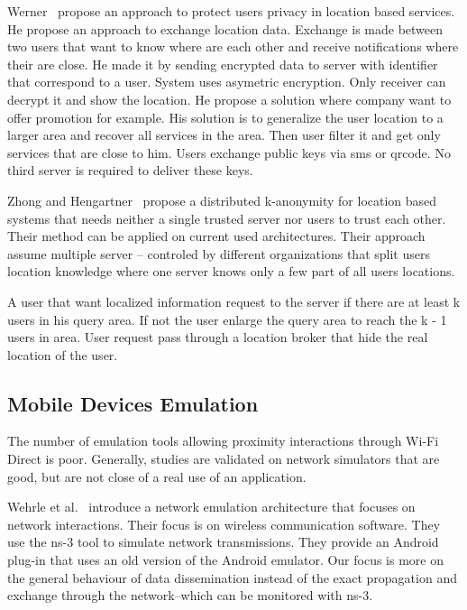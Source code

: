 Werner~\cite{DBLP:conf/mobisec/Werner10} propose an approach to protect users privacy in location based services.
He propose an approach to exchange location data.
Exchange is made between two users that want to know where are each other and receive notifications where their are close.
He made it by sending encrypted data to server with identifier that correspond to a user.
System uses asymetric encryption.
Only receiver can decrypt it and show the location.
He propose a solution where company want to offer promotion for example.
His solution is to generalize the user location to a larger area and recover all services in the area.
Then user filter it and get only services that are close to him.
Users exchange public keys via sms or qrcode.
No third server is required to deliver these keys.

Zhong and Hengartner~\cite{DBLP:conf/percom/ZhongH09} propose a distributed k-anonymity for location based systems that needs neither a single trusted server nor users to trust each other.
Their method can be applied on current used architectures.
Their approach assume multiple server -- controled by different organizations that split users location knowledge where one server knows only a few part of all users locations.

A user that want localized information request to the server if there are at least k users in his query area. If not the user enlarge the query area to reach the k - 1 users in area.
User request pass through a location broker that hide the real location of the user.


\subsection{Mobile Devices Emulation}

The number of emulation tools allowing proximity interactions through Wi-Fi Direct is poor.
Generally, studies are validated on network simulators that are good, but are not close of a real use of an application.

Wehrle et al.~\cite{DBLP:conf/simutools/WeingartnerLW11} introduce a network emulation architecture that focuses on network interactions.
Their focus is on wireless communication software.
They use the ns-3 tool to simulate network transmissions.
They provide an Android plug-in that uses an old version of the Android emulator.
Our focus is more on the general behaviour of data dissemination instead of the exact propagation and exchange through the network--which can be monitored with ns-3.

